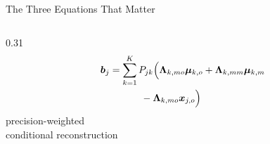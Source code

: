 \begin{frame}[shrink=7]{The Three Equations That Matter}
\begin{columns}[T,onlytextwidth]
\begin{column}{0.31\textwidth}
\[\begin{aligned}
                \bm{b}_j
                &=
                \sum_{k=1}^{K}
                P_{jk}
                \Big(
                \mathbf{\Lambda}_{k,mo}\bm{\mu}_{k,o}
                +\mathbf{\Lambda}_{k,mm}\bm{\mu}_{k,m}\\
                &\hspace{3.2em}
                -\mathbf{\Lambda}_{k,mo}\bm{x}_{j,o}
                \Big)
            \end{aligned}
            \]
            \centering
            \footnotesize precision-weighted\\conditional reconstruction
        \end{column}
    \end{columns}
\end{frame}
